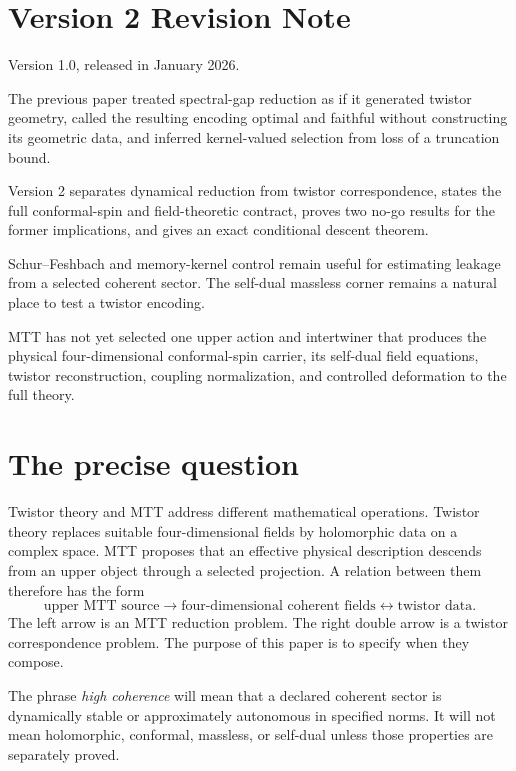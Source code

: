 \documentclass[11pt]{article}
\begin{document}
\section*{Version 2 Revision Note}
\begin{description}[leftmargin=2.8cm,style=nextline]
\item[Supersedes] Version 1.0, released in January 2026.
\item[Reason] The previous paper treated spectral-gap reduction as if it
generated twistor geometry, called the resulting encoding optimal and
faithful without constructing its geometric data, and inferred
kernel-valued selection from loss of a truncation bound.
\item[Resolution] Version 2 separates dynamical reduction from twistor
correspondence, states the full conformal-spin and field-theoretic contract,
proves two no-go results for the former implications, and gives an exact
conditional descent theorem.
\item[Retained content] Schur--Feshbach and memory-kernel control remain
useful for estimating leakage from a selected coherent sector. The
self-dual massless corner remains a natural place to test a twistor encoding.
\item[Open boundary] MTT has not yet selected one upper action and
intertwiner that produces the physical four-dimensional conformal-spin
carrier, its self-dual field equations, twistor reconstruction, coupling
normalization, and controlled deformation to the full theory.
\end{description}

\tableofcontents

\section{The precise question}

Twistor theory and MTT address different mathematical operations. Twistor
theory replaces suitable four-dimensional fields by holomorphic data on a
complex space. MTT proposes that an effective physical description descends
from an upper object through a selected projection. A relation between them
therefore has the form
\[
\text{upper MTT source}
\longrightarrow
\text{four-dimensional coherent fields}
\longleftrightarrow
\text{twistor data}.
\]
The left arrow is an MTT reduction problem. The right double arrow is a
twistor correspondence problem. The purpose of this paper is to specify when
they compose.

The phrase \emph{high coherence} will mean that a declared coherent sector is
dynamically stable or approximately autonomous in specified norms. It will
not mean holomorphic, conformal, massless, or self-dual unless those
properties are separately proved.
\end{document}
